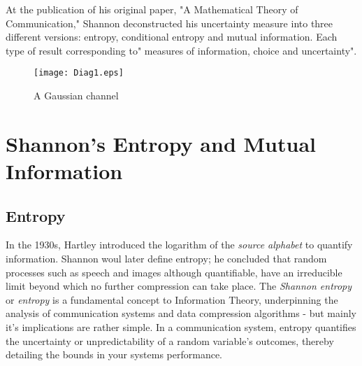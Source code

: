 \documentclass[journal,12pt,onecolumn,draftclsnofoot,]{IEEEtran}
\begin{document}
	
	At the publication of his original paper, "A Mathematical Theory of Communication," Shannon deconstructed his uncertainty measure into three different versions: entropy, conditional entropy and mutual information. Each type of result corresponding to" measures of information, choice and uncertainty".
	\begin{figure}[h!]
	\centering
	\texttt{[image: Diag1.eps]} 
	\centering
	\caption{A Gaussian channel}
	\end{figure}


	
	
	
	\section{Shannon's Entropy and Mutual Information}
	
	\subsection{Entropy}
	In the 1930s, Hartley introduced the logarithm of the \emph{source alphabet} to quantify information. Shannon woul later define entropy; he concluded that random processes such as speech and images although quantifiable, have an irreducible limit beyond which no further compression can take place. The  \emph{Shannon entropy} or \emph{entropy} is a fundamental concept to Information Theory, underpinning the analysis of communication systems and data compression algorithms - but mainly it's implications  are rather simple. In a communication system, entropy quantifies the uncertainty or unpredictability of a random variable's outcomes, thereby detailing the bounds in  your systems performance. 
	
\end{document}
